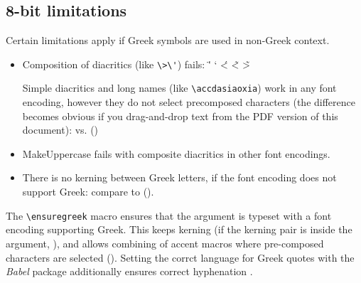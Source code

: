 \documentclass{article}
\makeatletter
\newcommand{\currentEncoding}{\f@encoding}
\makeatother
\begin{document}
\subsection{8-bit limitations \label{sec:8-bit-limitations}}

Certain limitations apply if Greek symbols are used in non-Greek context.

\begin{itemize}

\item Composition of diacritics (like \verb+\>\'+) fails:
      \<{\alpha} \>{\epsilon} \"'{\iota} \>`\eta{}
      \'<{\omicron} \~<{\upsilon} \~>{\omega}

      Simple diacritics and long names (like \verb+\accdasiaoxia+) work in
      any font encoding, however they do not select precomposed characters
      (the difference becomes obvious if you drag-and-drop text from the PDF
      version of this document):
      \ensuregreek{\<'\alpha{} \accdasia\acctonos\alpha{} \accdasiaoxia\alpha{}
      (\currentEncoding)} vs. \accdasiaoxia\alpha{} (\currentEncoding)

\item MakeUppercase fails with composite diacritics in other font encodings.

\item There is no kerning between Greek letters, if the font encoding does not
      support Greek: compare \ensuregreek{\Alpha\Upsilon\Alpha{}
      (\currentEncoding)} to \Alpha\Upsilon\Alpha{} (\currentEncoding).
\end{itemize}
%
The \verb+\ensuregreek+ macro ensures that the argument is typeset with a
font encoding supporting Greek. This keeps kerning (if the kerning pair is
inside the argument, \ensuregreek{\Alpha\"\Upsilon\Alpha}), and allows
combining of accent macros where pre-composed characters are selected
().
Setting the corrct language for Greek quotes with the \emph{Babel} package
additionally ensures correct hyphenation .
\end{document}
